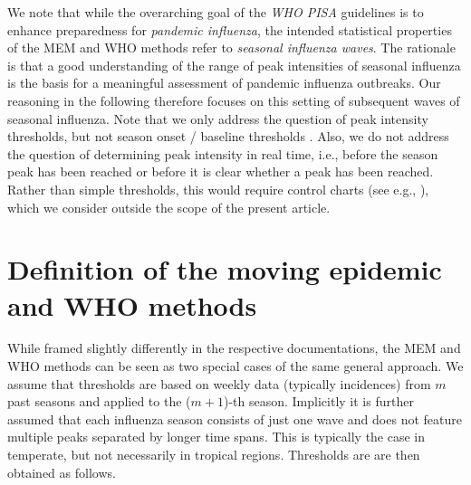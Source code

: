 \documentclass{article}
\begin{document}
\noindent We note that while the overarching goal of the \textit{WHO PISA} guidelines is to enhance preparedness for \textit{pandemic influenza}, the intended statistical properties of the MEM and WHO methods refer to \textit{seasonal influenza waves}. The rationale is that a good understanding of the range of peak intensities of seasonal influenza is the basis for a meaningful assessment of pandemic influenza outbreaks. Our reasoning in the following therefore focuses on this setting of subsequent waves of seasonal influenza. Note that we only address the question of peak intensity thresholds, but not season onset / baseline thresholds \citep{Vega2013}. Also, we do not address the question of determining peak intensity in real time, i.e., before the season peak has been reached or before it is clear whether a peak has been reached. Rather than simple thresholds, this would require control charts (see e.g., \citealt{Liu2019}), which we consider outside the scope of the present article.

\section{Definition of the moving epidemic and WHO methods}
\label{sec:definitions}

While framed slightly differently in the respective documentations, the MEM and WHO methods can be seen as two special cases of the same general approach. We assume that thresholds are based on weekly data (typically incidences) from $m$ past seasons and applied to the ($m + 1$)-th season. Implicitly it is further assumed that each influenza season consists of just one wave and does not feature multiple peaks separated by longer time spans. This is typically the case in temperate, but not necessarily in tropical regions. Thresholds are are then obtained as follows.
\end{document}

